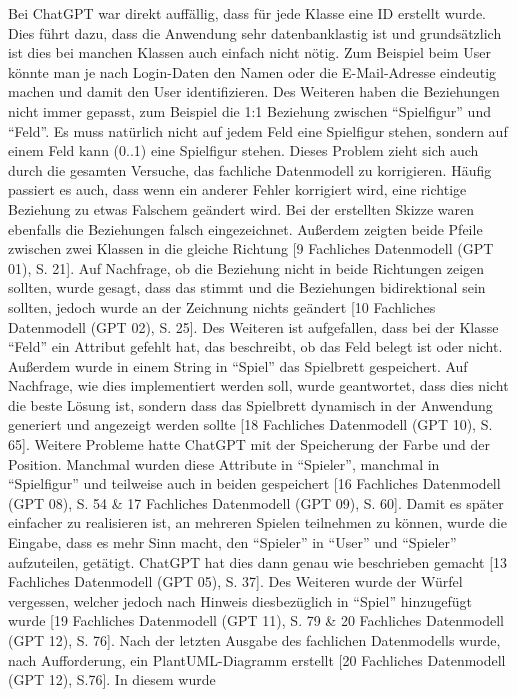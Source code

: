 Bei ChatGPT war direkt auffällig, dass für jede Klasse eine ID erstellt wurde. Dies führt dazu, dass die Anwendung sehr 
datenbanklastig ist und grundsätzlich ist dies bei manchen Klassen auch einfach nicht nötig. Zum Beispiel beim User könnte man 
je nach Login-Daten den Namen oder die E-Mail-Adresse eindeutig machen und damit den User identifizieren. Des Weiteren haben 
die Beziehungen nicht immer gepasst, zum Beispiel die 1:1 Beziehung zwischen ``Spielfigur'' und ``Feld''. Es muss natürlich nicht 
auf jedem Feld eine Spielfigur stehen, sondern auf einem Feld kann (0..1) eine Spielfigur stehen. Dieses Problem zieht sich auch 
durch die gesamten Versuche, das fachliche Datenmodell zu korrigieren. Häufig passiert es auch, dass wenn ein anderer Fehler korrigiert 
wird, eine richtige Beziehung zu etwas Falschem geändert wird. Bei der erstellten Skizze waren ebenfalls die Beziehungen falsch 
eingezeichnet. Außerdem zeigten beide Pfeile zwischen zwei Klassen in die gleiche Richtung [9 Fachliches Datenmodell (GPT 01), S. 21]. 
Auf Nachfrage, ob die Beziehung nicht in beide Richtungen zeigen sollten, wurde gesagt, dass das stimmt und die Beziehungen bidirektional 
sein sollten, jedoch wurde an der Zeichnung nichts geändert [10 Fachliches Datenmodell (GPT 02), S. 25]. Des Weiteren ist aufgefallen, 
dass bei der Klasse ``Feld'' ein Attribut gefehlt hat, das beschreibt, ob das Feld belegt ist oder nicht. Außerdem wurde in einem 
String in ``Spiel'' das Spielbrett gespeichert. Auf Nachfrage, wie dies implementiert werden soll, wurde geantwortet, dass dies nicht 
die beste Lösung ist, sondern dass das Spielbrett dynamisch in der Anwendung generiert und angezeigt werden sollte 
[18 Fachliches Datenmodell (GPT 10), S. 65]. Weitere Probleme hatte ChatGPT mit der Speicherung der Farbe und der Position. 
Manchmal wurden diese Attribute in ``Spieler'', manchmal in ``Spielfigur'' und teilweise auch in beiden gespeichert 
[16 Fachliches Datenmodell (GPT 08), S. 54 \& 17 Fachliches Datenmodell (GPT 09), S. 60]. Damit es später einfacher zu realisieren 
ist, an mehreren Spielen teilnehmen zu können, wurde die Eingabe, dass es mehr Sinn macht, den ``Spieler'' in ``User'' und ``Spieler'' 
aufzuteilen, getätigt. ChatGPT hat dies dann genau wie beschrieben gemacht [13 Fachliches Datenmodell (GPT 05), S. 37]. Des Weiteren 
wurde der Würfel vergessen, welcher jedoch nach Hinweis diesbezüglich in ``Spiel'' hinzugefügt wurde 
[19 Fachliches Datenmodell (GPT 11), S. 79 \& 20 Fachliches Datenmodell (GPT 12), S. 76]. Nach der letzten Ausgabe des fachlichen 
Datenmodells wurde, nach Aufforderung, ein PlantUML-Diagramm erstellt [20 Fachliches Datenmodell (GPT 12), S.76]. In diesem wurde 
